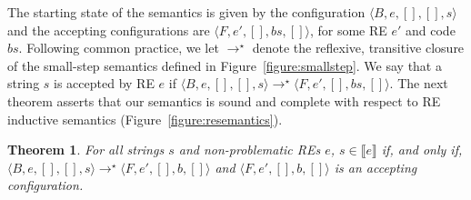 \documentclass[oneside,12pt]{scrbook}
\newtheorem{Theorem}{Theorem}
\theoremstyle{definition}
\newcommand{\sembrackets}[1]{\ensuremath{\llbracket #1 \rrbracket}}
\newcommand{\conf}[1]{\ensuremath{\langle #1 \rangle}}
\theoremstyle{plain}
\theoremstyle{definition}
\begin{document}
The starting state of the semantics is given by the configuration
$\conf{B,e,[],[],s}$ and the accepting configurations are $\conf{F,e',[],bs,[]}$, for some RE $e'$ and code $bs$.
Following common practice, we let $\to^\star$ denote the reflexive, transitive closure of the small-step
semantics defined in Figure~\ref{figure:smallstep}.
We say that a string $s$ is accepted by RE $e$ if $\conf{B,e,[],[],s}\to^\star\conf{F,e',[],bs,[]}$.
The next theorem asserts that our semantics is sound and complete with respect to RE
inductive semantics (Figure~\ref{figure:resemantics}).

\begin{Theorem}
	For all strings $s$ and non-problematic REs $e$, $s\in\sembrackets{e}$ if, and only if, $\conf{B,e,[],[],s}\to^\star\conf{F,e',[],b,[]}$ and
	$\conf{F,e',[],b,[]}$ is an accepting configuration.
\end{Theorem}
\end{document}

